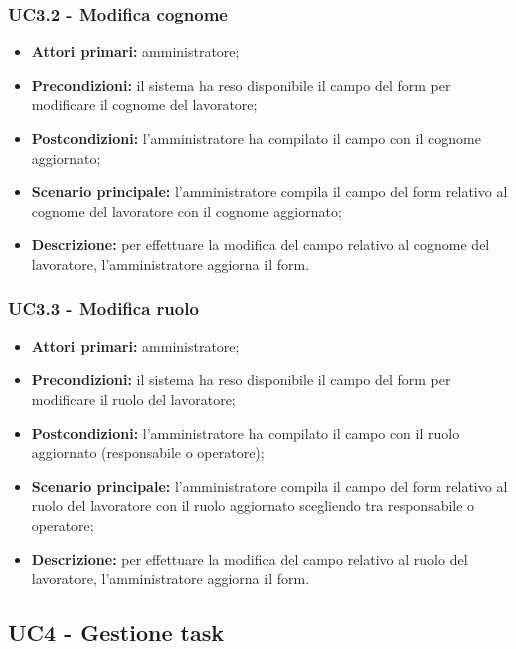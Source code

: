 \subsubsection{UC3.2 - Modifica cognome}

\begin{itemize}
	\item 	\textbf{Attori primari:} amministratore;
	\item 	\textbf{Precondizioni:} il sistema ha reso disponibile il campo del form per modificare il cognome del lavoratore;
	\item 	\textbf{Postcondizioni:} l’amministratore ha compilato il campo con il cognome aggiornato;
	\item 	\textbf{Scenario principale:} l’amministratore compila il campo del form relativo al cognome del lavoratore con il cognome aggiornato;
	\item 	\textbf{Descrizione:} per effettuare la modifica del campo relativo al cognome del lavoratore, l’amministratore aggiorna il form.

\end{itemize}
\subsubsection{UC3.3 - Modifica ruolo}

\begin{itemize}
	\item 	\textbf{Attori primari:} amministratore;
	\item 	\textbf{Precondizioni:} il sistema ha reso disponibile il campo del form per modificare il ruolo del lavoratore;
	\item 	\textbf{Postcondizioni:} l’amministratore ha compilato il campo con il ruolo aggiornato (responsabile o operatore);
	\item 	\textbf{Scenario principale:} l’amministratore compila il campo del form relativo al ruolo del lavoratore con il ruolo aggiornato scegliendo tra responsabile o operatore;
	\item 	\textbf{Descrizione:} per effettuare la modifica del campo relativo al ruolo del lavoratore, l’amministratore aggiorna il form.

\end{itemize}
\subsection{UC4 - Gestione task}

